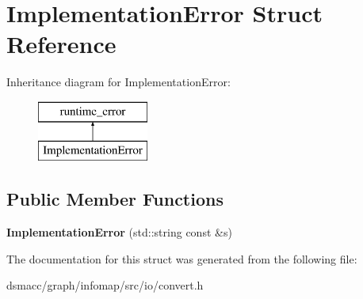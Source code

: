 \hypertarget{structImplementationError}{}\section{Implementation\+Error Struct Reference}
\label{structImplementationError}
Inheritance diagram for Implementation\+Error\+:\begin{figure}[H]
\begin{center}
\leavevmode
\includegraphics[height=2.000000cm]{structImplementationError}
\end{center}
\end{figure}
\subsection*{Public Member Functions}
\begin{DoxyCompactItemize}
\item 
\mbox{\label{structImplementationError_aef89490f2cc0ac70636f73ee9ebb163b}} 
{\bfseries Implementation\+Error} (std\+::string const \&s)
\end{DoxyCompactItemize}


The documentation for this struct was generated from the following file\+:\begin{DoxyCompactItemize}
\item 
dsmacc/graph/infomap/src/io/convert.\+h\end{DoxyCompactItemize}
